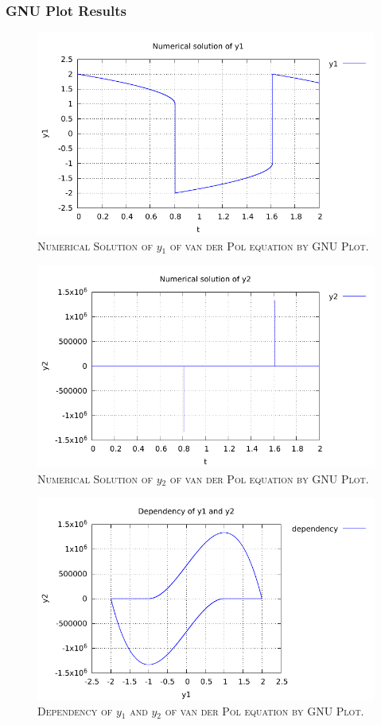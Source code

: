\documentclass[a4paper,oneside]{book}
\numberwithin{equation}{chapter}
\begin{document}
\subsubsection{GNU Plot Results}
\begin{figure}[H]
\centering
\includegraphics[scale=1.1]{vdp_1}
\caption{\textsc{Numerical Solution of $y_1$ of van der Pol equation by GNU Plot.}}
\end{figure}
\begin{figure}[H]
\centering
\includegraphics[scale=1.1]{vdp_2}
\caption{\textsc{Numerical Solution of $y_2$ of van der Pol equation by GNU Plot.}}
\end{figure}
\begin{figure}[H]
\centering
\includegraphics[scale=1.1]{vdp_d_1_2}
\caption{\textsc{Dependency of $y_1$ and $y_2$ of van der Pol equation by GNU Plot.}}
\end{figure}
\end{document}
